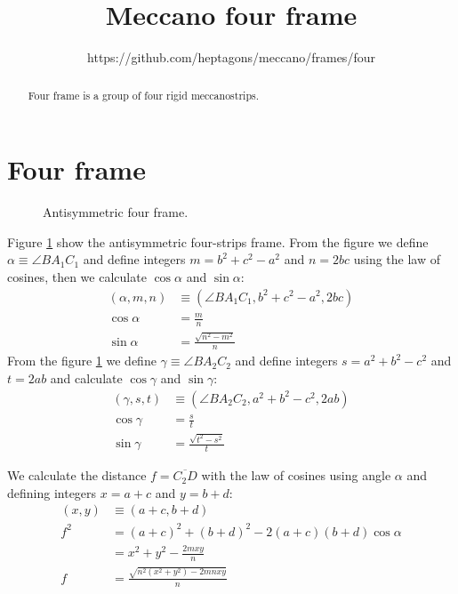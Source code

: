 \documentclass[11pt]{article}
\title{\textbf{Meccano four frame}}
\author{https://github.com/heptagons/meccano/frames/four}
\date{}
\begin{document}
\maketitle
\begin{abstract}
Four frame is a group of four rigid meccano\meccanoref strips.
\end{abstract}

\section{Four frame}

\begin{figure}[H]
 \centering
 \caption{Antisymmetric four frame.}
 \label{fig:four}
\end{figure}

Figure \ref{fig:four} show the antisymmetric four-strips frame.
From the figure we define $\alpha \equiv \angle{BA_1C_1}$ and define integers $m=b^2 + c^2 - a^2$ and $n=2bc$ using the law of cosines, then we calculate $\cos\alpha$ and $\sin\alpha$:
\begin{align}
(\alpha,m,n) &\equiv (\angle{BA_1C_1},b^2 + c^2 - a^2, 2bc) \label{eq:mn}\\
\cos\alpha &= \frac{m}n\\
\sin\alpha &= \frac{\sqrt{n^2-m^2}}n
\end{align}
From the figure \ref{fig:four} we define $\gamma \equiv \angle{BA_2C_2}$ and define integers $s=a^2 + b^2 - c^2$ and $t=2ab$ and calculate $\cos\gamma$ and $\sin\gamma$:
\begin{align}
(\gamma,s,t) &\equiv (\angle{BA_2C_2}, a^2 + b^2 - c^2, 2ab) \label{eq:st}\\
\cos\gamma &= \frac{s}{t}\\
\sin\gamma &= \frac{\sqrt{t^2-s^2}}{t}
\end{align}

We calculate the distance $f = \overline{C_2D}$ with the law of cosines using angle $\alpha$
and defining integers $x = a+c$ and $y = b+d$:
\begin{align}
(x, y) &\equiv (a + c, b + d) \label{eq:xy}\\
f^2 &= (a+c)^2 + (b+d)^2 - 2(a+c)(b+d)\cos\alpha\\
 &= x^2 + y^2 - \frac{2mxy}n\\
f &= \frac{\sqrt{n^2(x^2 + y^2) - 2mnxy}}n
\end{align}
\end{document}
